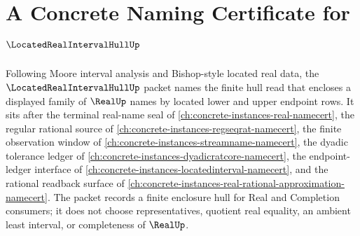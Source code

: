 \chapter{A Concrete Naming Certificate for $\LocatedRealIntervalHullUp$}
\label{ch:concrete-instances-located-real-interval-hull-namecert}

Following Moore interval analysis and Bishop-style located real data, the $\LocatedRealIntervalHullUp$ packet names the finite hull read that encloses a displayed family of $\RealUp$ names by located lower and upper endpoint rows. It sits after the terminal real-name seal of \autoref{ch:concrete-instances-real-namecert}, the regular rational source of \autoref{ch:concrete-instances-regseqrat-namecert}, the finite observation window of \autoref{ch:concrete-instances-streamname-namecert}, the dyadic tolerance ledger of \autoref{ch:concrete-instances-dyadicratcore-namecert}, the endpoint-ledger interface of \autoref{ch:concrete-instances-locatedinterval-namecert}, and the rational readback surface of \autoref{ch:concrete-instances-real-rational-approximation-namecert}. The packet records a finite enclosure hull for Real and Completion consumers; it does not choose representatives, quotient real equality, an ambient least interval, or completeness of $\RealUp$.

